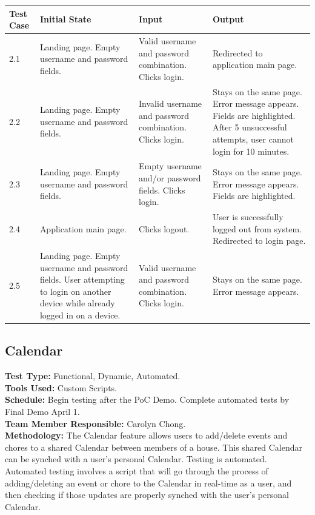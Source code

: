 \documentclass[12pt]{article}
\begin{document}
\begin{longtable}{|p{2cm}|p{3cm}|p{5cm}|p{5cm}|}
\hline
\textbf{Test Case}  & \textbf{Initial State} & \textbf{Input} & \textbf{Output} \\ \hline
2.1 & Landing page. Empty username and password fields. & Valid username and password combination. Clicks login. & Redirected to application main page. \\ 
\hline
2.2 & Landing page. Empty username and password fields. & Invalid username and password combination. Clicks login. & Stays on the same page. Error message appears. Fields are highlighted. After 5 unsuccessful attempts, user cannot login for 10 minutes. \\
\hline
2.3 & Landing page. Empty username and password fields. & Empty username and/or password fields. Clicks login. & Stays on the same page. Error message appears. Fields are highlighted. \\
\hline
2.4 & Application main page. & Clicks logout. & User is successfully logged out from system. Redirected to login page. \\
\hline
2.5 & Landing page. Empty username and password fields. User attempting to login on another device while already logged in on a device. & Valid username and password combination. Clicks login. & Stays on the same page. Error message appears. \\ 
\hline
\end{longtable}



\subsection{Calendar}
\textbf{Test Type:} Functional, Dynamic, Automated. \\
\textbf{Tools Used:} Custom Scripts. \\
\textbf{Schedule:} Begin testing after the PoC Demo. Complete automated tests by Final Demo April 1. \\
\textbf{Team Member Responsible:} Carolyn Chong. \\
\textbf{Methodology:} The Calendar feature allows users to add/delete events and chores to a shared Calendar between members of a house. This shared Calendar can be synched with a user's personal Calendar. Testing is automated. Automated testing involves a script that will go through the process of adding/deleting an event or chore to the Calendar in real-time as a user, and then checking if those updates are properly synched with the user's personal Calendar. 
\end{document}
